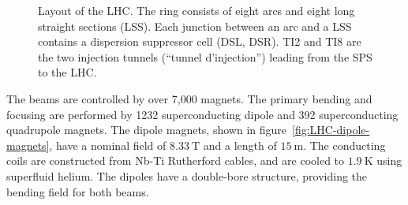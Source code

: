 \begin{figure}[htbp]
	\centering
	\caption{Layout of the LHC. The ring consists of eight arcs and eight long straight sections (LSS). Each junction between an arc and a LSS contains a dispersion suppressor cell (DSL, DSR). TI2 and TI8 are the two injection tunnels (``tunnel d'injection'') leading from the SPS to the LHC.}
	\label{fig:LHC-segments}
\end{figure}


The beams are controlled by over 7,000 magnets. The primary bending and focusing are performed by 1232 superconducting dipole and 392 superconducting quadrupole magnets. The dipole magnets, shown in figure~\ref{fig:LHC-dipole-magnets}, have a nominal field of $8.33~\mbox{T}$ and a length of $15~\mbox{m}$. The conducting coils are constructed from Nb-Ti Rutherford cables, and are cooled to $1.9~\mbox{K}$ using superfluid helium. The dipoles have a double-bore structure, providing the bending field for both beams. 

